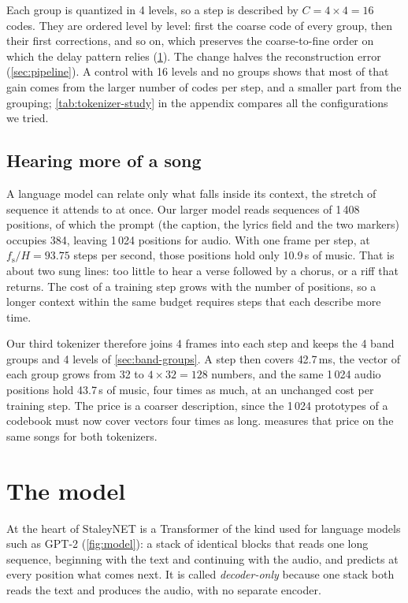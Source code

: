 Each group is quantized in 4 levels, so a step is described by $C = 4 \times 4
= 16$ codes. They are ordered level by level: first the coarse code of every
group, then their first corrections, and so on, which preserves the
coarse-to-fine order on which the delay pattern relies (\cref{sec:model}). The
change halves the reconstruction error (\cref{sec:pipeline}). A control with
16 levels and no groups shows that most of that gain comes from the larger
number of codes per step, and a smaller part from the grouping;
\cref{tab:tokenizer-study} in the appendix compares all the configurations we
tried.

\subsection{Hearing more of a song}
\label{sec:context}

A language model can relate only what falls inside its context, the stretch
of sequence it attends to at once. Our larger model reads sequences of
1\,408 positions, of which the prompt (the caption, the lyrics field and the
two markers) occupies 384, leaving 1\,024 positions for audio. With one frame
per step, at $f_\text{s}/H = 93.75$ steps per second, those positions hold
only 10.9\,s of music. That is about two sung lines: too little to hear a verse
followed by a chorus, or a riff that returns. The cost of a training step grows
with the number of positions, so a longer context within the same budget
requires steps that each describe more time.

Our third tokenizer therefore joins 4 frames into each step and keeps the 4
band groups and 4 levels of \cref{sec:band-groups}. A step then covers
42.7\,ms, the vector of each group grows from 32 to $4 \times 32 = 128$
numbers, and the same 1\,024 audio positions hold 43.7\,s of music, four
times as much, at an unchanged cost per training step. The price is a coarser
description, since the 1\,024 prototypes of a codebook must now cover vectors
four times as long.  measures that price on the same songs for
both tokenizers.

\section{The model}
\label{sec:model}

At the heart of StaleyNET is a Transformer of the kind used for language
models such as GPT-2 \cite{vaswani2017attention,radford2019language}
(\cref{fig:model}): a stack of identical blocks that reads one long sequence,
beginning with the text and continuing with the audio, and predicts at every
position what comes next. It is called \emph{decoder-only} because one stack
both reads the text and produces the audio, with no separate encoder.


